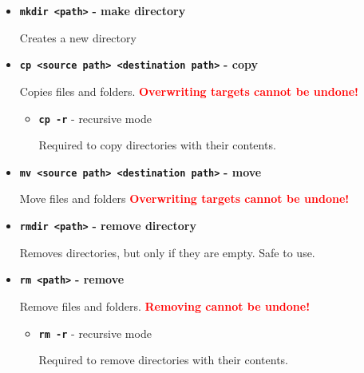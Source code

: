 \documentclass[aspectratio=1610]{beamer}
\newcommand\curtitle{}
\newcommand\command[1]{\alert{\textbf{\texttt{#1}}}}
\begin{document}
\begin{frame}[c]{\curtitle}
    \begin{itemize}[<+->]
        \setlength\itemsep{1em}
        \item \command{mkdir <path>} \textbf{- make directory} 

            Creates a new directory
        \item \command{cp <source path> <destination path>} \textbf{- copy} 

            Copies files and folders. \textcolor{red}{\textbf{Overwriting targets cannot be
            undone!}}
            \begin{itemize}[<.->]
                \item \command{cp -r} - recursive mode

                    Required to copy directories with their contents.
            \end{itemize}
        \item \command{mv <source path> <destination path>} \textbf{- move} 

            Move files and folders \textcolor{red}{\textbf{Overwriting targets cannot be undone!}}
        \item \command{rmdir <path>} \textbf{- remove directory} 

            Removes directories, but only if they are empty. Safe to use.
    \end{itemize}
\end{frame}


\begin{frame}[c]{\curtitle}
    \begin{itemize}[<+->]
        \setlength\itemsep{1em}
        \item \command{rm <path>} \textbf{- remove} 

            Remove files and folders. \textcolor{red}{\textbf{Removing cannot be undone!}}
            \begin{itemize}[<.->]
                \item \command{rm -r} - recursive mode

                    Required to remove directories with their contents.
            \end{itemize}
    \end{itemize}
\end{frame}
\end{document}

